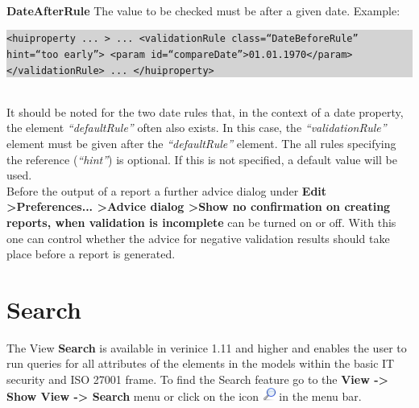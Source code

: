 \documentclass[a4paper,10pt]{book}
\begin{document}
\newline\\
\textbf{DateAfterRule}
\newline
The value to be checked must be after a given date.
\newline
Example:
\newline\\
\colorbox{lightgray}{\parbox{\textwidth}{
{\tt <huiproperty ... >\newline
   ...\newline
   <validationRule class=``DateBeforeRule'' hint=``too early''>\newline
      <param id=``compareDate''>01.01.1970</param>\newline
   </validationRule>\newline
   ...\newline
</huiproperty>}
}}
\newline\\
It should be noted for the two date rules that, in the context of a date property, the element \textit{``defaultRule''} often also exists. In this case, the \textit{``validationRule''} element must be given after the \textit{``defaultRule''} element.
\newline
The all rules specifying the reference (\textit{``hint''}) is optional.
If this is not specified, a default value will be used.
\newline\\
Before the output of a report a further advice dialog under \textbf{Edit \textgreater Preferences... \textgreater Advice dialog \textgreater Show no confirmation on creating reports, when validation is incomplete} can be turned on or off.
With this one can control whether the advice for negative validation results should take place before a report is generated.

\section{Search}
\label{sec:search}

The View \textbf{Search} is available in verinice 1.11 and higher and
enables the user to run queries for all attributes of the elements in
the models within the basic IT security and ISO 27001 frame. To find
the Search feature go to the \textbf{View -> Show View -> Search} menu
or click on the icon \includegraphics[height=2ex]{Icon/search.png} in
the menu bar.
\end{document}

